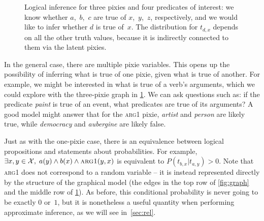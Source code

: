 \documentclass[11pt]{article}
\begin{document}
\begin{figure}
\centering
\vspace*{-3mm}

\caption{Logical inference for three pixies
and four predicates of interest:
we know whether $a$,~$b$,~$c$ are true of $x$,~$y$,~$z$, respectively,
and we would like to infer whether $d$ is true of~$x$.
The distribution for $t_{d,x}$
depends on all the other truth values,
because it is indirectly connected to them via the latent pixies.
}
\label{fig:log-three}

\end{figure}


In the general case, there are multiple pixie variables.
This opens up the possibility of inferring what is true of one pixie,
given what is true of another.
For example, we might be interested in what is true of a verb's arguments,
which we could explore with the three-pixie graph in \cref{fig:log-three}.
We can ask questions such as: if the predicate \textit{paint} is true of an event,
what predicates are true of its arguments?
A good model might answer that for the \textsc{arg1} pixie,
\textit{artist} and \textit{person} are likely true,
while \textit{democracy} and \textit{aubergine} are likely false.

Just as with the one-pixie case,
there is an equivalence between logical propositions and statements about probabilities.
For example, ${\exists x,y\in\mathcal{X},\; a(y) \land b(x) \land \textsc{arg1}(y,x)}$
is equivalent to ${P(t_{b,x}|t_{a,y})>0}$.
Note that \textsc{arg1} does not correspond to a random variable --
it is instead represented directly by the structure of the graphical model
(the edges in the top row of \cref{fig:graph}
and the middle row of \cref{fig:log-three}).
As before, this conditional probability is never going to be exactly $0$ or~$1$,
but it is nonetheless a useful quantity when performing approximate inference,
as we will see in~\cref{sec:rel}.
\end{document}
